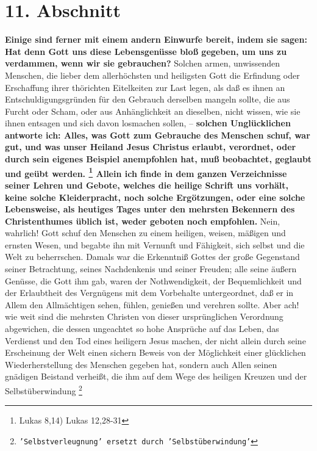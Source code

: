 {\section{11. Abschnitt} \label{kap17_ab11}

\label{ref:17_11_einwand_2} \textbf{Einige sind ferner mit einem andern Einwurfe bereit, indem sie sagen:
Hat denn
Gott uns diese Lebensgenüsse bloß gegeben, um uns zu verdammen, wenn wir sie
gebrauchen?} Solchen armen, unwissenden Menschen, die lieber dem allerhöchsten
und heiligsten Gott die Erfindung oder Erschaffung ihrer thörichten Eitelkeiten
zur Last legen, als daß es ihnen an Entschuldigungsgründen für den Gebrauch
derselben mangeln sollte, die aus Furcht oder Scham, oder aus Anhänglichkeit an
dieselben, nicht wissen, wie sie ihnen entsagen und sich davon losmachen sollen,
-- \label{ref:17_11_beteubung}\textbf{solchen Unglücklichen antworte ich: Alles, was Gott zum Gebrauche des
Menschen schuf, war gut, und was unser Heiland Jesus Christus erlaubt,
verordnet, oder durch sein eigenes Beispiel anempfohlen hat, muß beobachtet,
geglaubt und geübt werden. 
\footnote{Lukas  8,14) Lukas 12,28-31}
Allein ich
finde in dem ganzen Verzeichnisse seiner Lehren und Gebote, welches die heilige
Schrift uns vorhält, keine solche Kleiderpracht, noch solche Ergötzungen, oder
eine solche Lebensweise, als heutiges Tages unter den mehrsten Bekennern des
Christenthumes üblich ist, weder geboten noch empfohlen.} Nein, wahrlich! Gott
schuf den Menschen zu einem heiligen, weisen, mäßigen und ernsten Wesen, und
begabte ihn mit Vernunft und Fähigkeit, sich selbst und die Welt zu beherrschen.
Damals war die Erkenntniß Gottes der große Gegenstand seiner Betrachtung, seines
Nachdenkenis und seiner Freuden; alle seine äußern Genüsse, die Gott ihm gab,
waren der Nothwendigkeit, der Bequemlichkeit und der Erlaubtheit des Vergnügens
mit dem Vorbehalte untergeordnet, daß er in Allem den Allmächtigen sehen,
fühlen, genießen und verehren sollte. Aber ach! wie weit sind die mehrsten
Christen von dieser ursprünglichen Verordnung abgewichen, die dessen ungeachtet
so hohe Ansprüche auf das Leben, das Verdienst und den Tod eines heiligern Jesus
machen, der nicht allein durch seine Erscheinung der Welt einen sichern Beweis
von der Möglichkeit einer glücklichen Wiederherstellung des Menschen gegeben
hat, sondern auch Allen seinen gnädigen Beistand verheißt, die ihm auf dem Wege
des heiligen Kreuzen und der Selbstüberwindung
\footnote{\texttt{'Selbstverleugnung' ersetzt durch 'Selbstüberwindung'}}
}
